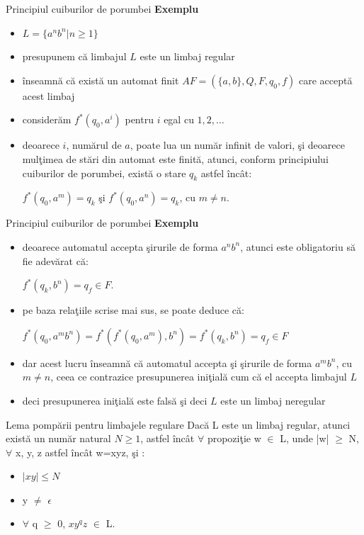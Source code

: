 \documentclass[pdf]{beamer}
\begin{document}
\begin{frame}{Principiul cuiburilor de porumbei}
\textbf{Exemplu}
\begin{itemize}
\item
$ L = \{ a^n b^n | n \geq 1  \} $
\item
presupunem că limbajul $ L $ este un limbaj regular
\item
înseamnă că există un automat finit $AF=(\{ a, b \}, Q, F, q_{0}, f)$ care acceptă acest limbaj
\item
considerăm $ f^* (q_0, a^i) $ pentru $ i $ egal cu $ 1, 2, \dots $
\item
deoarece $ i $, numărul de $ a $, poate lua un număr infinit de valori, şi deoarece mulţimea de stări din automat este finită, atunci, conform principiului cuiburilor de porumbei, există o stare $ q_k $ astfel încât:

$ f^* (q_0, a^m) = q_k $ şi $ f^* (q_0, a^n) = q_k $, cu $ m \neq n $.
\end{itemize}
\end{frame}



\begin{frame}{Principiul cuiburilor de porumbei}
\textbf{Exemplu}
\begin{itemize}
\item
deoarece automatul accepta şirurile de forma $ a^n b^n $, atunci este obligatoriu să fie adevărat că:

$ f^* (q_k, b^n) = q_f \in F $.
\item
pe baza relaţiile scrise mai sus, se poate deduce că:

$ f^* (q_0, a^m b^n) = f^* (f^* (q_0, a^m), b^n) = f^* (q_k, b^n) = q_f \in F$ 
\item
dar acest lucru înseamnă că automatul accepta şi şirurile de forma $ a^m b^n $, cu $ m \neq n $, ceea ce contrazice presupunerea iniţială cum că el accepta limbajul $ L $
\item
deci presupunerea iniţială este falsă şi deci $ L $ este un limbaj neregular
\end{itemize}
\end{frame}



\begin{frame}{Lema pompării pentru limbajele regulare}
Dacă L este un limbaj regular, atunci există un număr natural $N \geq 1$, astfel încât $\forall$ propoziţie w $\in$ L, unde |w| $\geq$ N, $\forall$ x, y, z astfel încât w=xyz, şi :
\begin{itemize}
\item
$|xy| \leq N$
\item
y $\neq$ $\epsilon$
\item
$\forall$ q $\geq$ 0, $xy^{q}z$ $\in$ L.
\end{itemize}
\end{frame}
\end{document}

